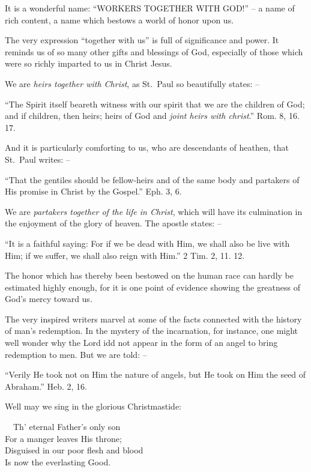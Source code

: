 \documentclass[
]{book}
\begin{document}
It is a wonderful name: ``WORKERS TOGETHER WITH GOD!'' -- a name of rich content, a name which bestows a world of honor upon us.

The very expression ``together with us'' is full of significance and power. It reminds us of so many other gifts and blessings of God, especially of those which were so richly imparted to us in Christ Jesus.

We are \emph{heirs together with Christ}, as St.~Paul so beautifully states: --

``The Spirit itself beareth witness with our spirit that we are the children of God; and if children, then heirs; heirs of God and \emph{joint heirs with christ}.'' Rom. 8, 16. 17.

And it is particularly comforting to us, who are descendants of heathen, that St.~Paul writes: --

``That the gentiles should be fellow-heirs and of the same body and partakers of His promise in Christ by the Gospel.'' Eph. 3, 6.

We are \emph{partakers together of the life in Christ}, which will have its culmination in the enjoyment of the glory of heaven. The apostle states: --

``It is a faithful saying: For if we be dead with Him, we shall also be live with Him; if we suffer, we shall also reign with Him.'' 2 Tim. 2, 11. 12.

The honor which has thereby been bestowed on the human race can hardly be estimated highly enough, for it is one point of evidence showing the greatness of God's mercy toward us.

The very inspired writers marvel at some of the facts connected with the history of man's redemption. In the mystery of the incarnation, for instance, one might well wonder why the Lord idd not appear in the form of an angel to bring redemption to men. But we are told: --

``Verily He took not on Him the nature of angels, but He took on Him the seed of Abraham.'' Heb. 2, 16.

Well may we sing in the glorious Christmastide:

~~Th' eternal Father's only son\\
\hspace*{0.333em}\hspace*{0.333em}For a manger leaves His throne;\\
\hspace*{0.333em}\hspace*{0.333em}Disguised in our poor flesh and blood\\
\hspace*{0.333em}\hspace*{0.333em}Is now the everlasting Good.
\end{document}

